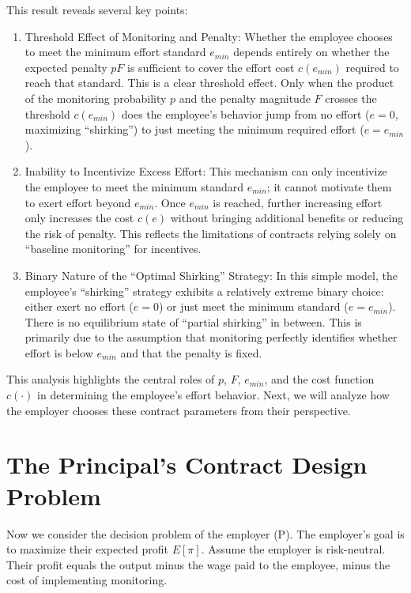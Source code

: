 This result reveals several key points:
\begin{enumerate}
    \item {Threshold Effect of Monitoring and Penalty}: Whether the employee chooses to meet the minimum effort standard $e_{min}$ depends entirely on whether the expected penalty $pF$ is sufficient to cover the effort cost $c(e_{min})$ required to reach that standard. This is a clear threshold effect. Only when the product of the monitoring probability $p$ and the penalty magnitude $F$ crosses the threshold $c(e_{min})$ does the employee's behavior jump from no effort ($e=0$, maximizing \enquote{shirking}) to just meeting the minimum required effort ($e=e_{min}$).
    \item {Inability to Incentivize Excess Effort}: This mechanism can only incentivize the employee to meet the minimum standard $e_{min}$; it cannot motivate them to exert effort beyond $e_{min}$. Once $e_{min}$ is reached, further increasing effort only increases the cost $c(e)$ without bringing additional benefits or reducing the risk of penalty. This reflects the limitations of contracts relying solely on \enquote{baseline monitoring} for incentives.
    \item {Binary Nature of the \enquote{Optimal Shirking} Strategy}: In this simple model, the employee's \enquote{shirking} strategy exhibits a relatively extreme binary choice: either exert no effort ($e=0$) or just meet the minimum standard ($e=e_{min}$). There is no equilibrium state of \enquote{partial shirking} in between. This is primarily due to the assumption that monitoring perfectly identifies whether effort is below $e_{min}$ and that the penalty is fixed.
\end{enumerate}

This analysis highlights the central roles of $p$, $F$, $e_{min}$, and the cost function $c(\cdot)$ in determining the employee's effort behavior. Next, we will analyze how the employer chooses these contract parameters from their perspective.

\section{The Principal's Contract Design Problem}
\label{sec:principal_problem}

Now we consider the decision problem of the employer (P). The employer's goal is to maximize their expected profit $E[\pi]$. Assume the employer is risk-neutral. Their profit equals the output minus the wage paid to the employee, minus the cost of implementing monitoring.

